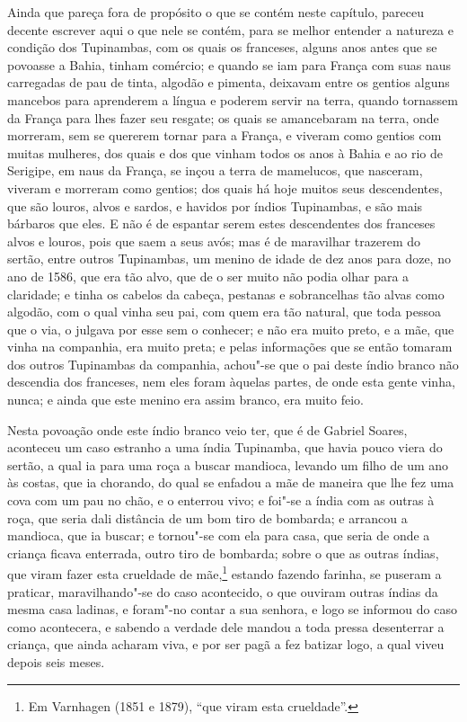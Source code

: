 Ainda que pareça fora de propósito o que se contém neste capítulo, pareceu decente
escrever aqui o que nele se contém, para se melhor entender a natureza e condição dos
Tupinambas, com os quais os franceses, alguns anos antes que se povoasse a Bahia, tinham
comércio; e quando se iam para França com suas naus carregadas de pau de tinta, algodão e
pimenta, deixavam entre os gentios alguns mancebos para aprenderem a língua e poderem
servir na terra, quando tornassem da França para lhes fazer seu resgate; os quais se
amancebaram na terra, onde morreram, sem se quererem tornar para a França, e viveram como
gentios com muitas mulheres, dos quais e dos que vinham todos os anos à Bahia e ao rio de
Serigipe, em naus da França, se inçou a terra de mamelucos, que nasceram, viveram e
morreram como gentios; dos quais há hoje muitos seus descendentes, que são louros, alvos e
sardos, e havidos por índios Tupinambas, e são mais bárbaros que eles. E não é de espantar
serem estes descendentes dos franceses alvos e louros, pois que saem a seus avós; mas é de
maravilhar trazerem do sertão, entre outros Tupinambas, um menino de idade de dez anos
para doze, no ano de 1586, que era tão alvo, que de o ser muito não podia olhar para a
claridade; e tinha os cabelos da cabeça, pestanas e sobrancelhas tão alvas como algodão,
com o qual vinha seu pai, com quem era tão natural, que toda pessoa que o via, o julgava
por esse sem o conhecer; e não era muito preto, e a mãe, que vinha na companhia, era muito
preta; e pelas informações que se então tomaram dos outros Tupinambas da companhia,
achou"-se que o pai deste índio branco não descendia dos franceses, nem eles foram àquelas
partes, de onde esta gente vinha, nunca; e ainda que este menino era assim branco, era
muito feio.

Nesta povoação onde este índio branco veio ter, que é de Gabriel Soares, aconteceu um caso
estranho a uma índia Tupinamba, que havia pouco viera do sertão, a qual ia para uma roça a
buscar mandioca, levando um filho de um ano às costas, que ia chorando, do qual se enfadou
a mãe de maneira que lhe fez uma cova com um pau no chão, e o enterrou vivo; e foi"-se a
índia com as outras à roça, que seria dali distância de um bom tiro de bombarda; e
arrancou a mandioca, que ia buscar; e tornou"-se com ela para casa, que seria de onde a
criança ficava enterrada, outro tiro de bombarda; sobre o que as outras índias, que viram
fazer esta crueldade de mãe,\footnote{ Em Varnhagen (1851 e 1879), ``que viram esta
crueldade''.} estando fazendo farinha, se puseram a praticar, maravilhando"-se do caso
acontecido, o que ouviram outras índias da mesma casa ladinas, e foram"-no contar a sua
senhora, e logo se informou do caso como acontecera, e sabendo a verdade dele mandou a
toda pressa desenterrar a criança, que ainda acharam viva, e por ser pagã a fez batizar
logo, a qual viveu depois seis meses.

